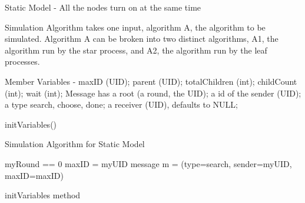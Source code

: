 \documentclass[english]{article}
\begin{document}
\begin{enumerate}
\begin{enumerate}
  \end{enumerate}

\end{enumerate}

Static Model - All the nodes turn on at the same time

Simulation Algorithm takes one input, algorithm A, the algorithm to be simulated. Algorithm A can be broken into two distinct algorithms, A1, the algorithm run by the star process, and A2, the algorithm run by the leaf processes.

Member Variables - maxID (UID); parent (UID); totalChildren (int); childCount (int); wait (int);
Message has a root (a round, the UID); a id of the sender (UID); a type {search, choose, done}; a receiver (UID), defaults to NULL;

\begin{algorithm}
  initVariables() \;

  \caption{Simulation Algorithm for Static Model}
\end{algorithm}

\begin{algorithm}[initVariables]
  myRound == 0 \; 
  maxID = myUID \; 
  message m = (type=search, sender=myUID, maxID=maxID) \;
  \caption{initVariables method}
\end{algorithm}
\end{document}
